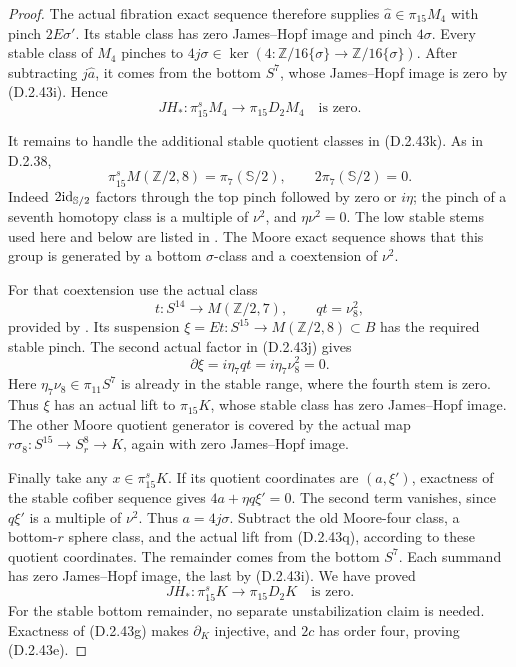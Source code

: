 \begin{proof}
The actual fibration exact sequence therefore supplies
$\widehat a\in\pi_{15}M_4$ with pinch $2E\sigma'$.
Its stable class has zero James--Hopf image and pinch
$4\sigma$. Every stable class of $M_4$ pinches to
$4j\sigma\in\ker(4:\mathbb Z/16\{\sigma\}\to
\mathbb Z/16\{\sigma\})$. After subtracting
$j\widehat a$, it comes from the bottom $S^7$, whose
James--Hopf image is zero by \textup{(D.2.43i)}. Hence
\[
 JH_*:\pi_{15}^{s}M_4\longrightarrow\pi_{15}D_2M_4
 \quad\text{is zero}.
 \tag{D.2.43n}
\]

It remains to handle the additional stable quotient
classes in \textup{(D.2.43k)}. As in D.2.38,
\[
 \pi_{15}^{s}M(\mathbb Z/2,8)=\pi_7(\mathbb S/2),
 \qquad 2\pi_7(\mathbb S/2)=0.
 \tag{D.2.43o}
\]
Indeed $2\mathrm{id}_{\mathbb S/2}$ factors through the top
pinch followed by zero or $i\eta$; the pinch of a seventh
homotopy class is a multiple of $\nu^2$, and
$\eta\nu^2=0$. The low stable stems used here and below
are listed in \cite[Section~2, (2.1), p.~149]{I_Oka1986}.
The Moore exact sequence shows that this group is
generated by a bottom $\sigma$-class and a coextension
of $\nu^2$.

For that coextension use the actual class
\[
 t:S^{14}\longrightarrow M(\mathbb Z/2,7),
 \qquad qt=\nu_8^2,
 \tag{D.2.43p}
\]
provided by
\cite[Lemma~2.8(ii), p.~523]{EH5MorisugiMukai2000}.
Its suspension
$\xi=Et:S^{15}\to M(\mathbb Z/2,8)\subset B$
has the required stable pinch. The second actual factor
in \textup{(D.2.43j)} gives
\[
 \partial\xi=i\eta_7qt=i\eta_7\nu_8^2=0.
 \tag{D.2.43q}
\]
Here $\eta_7\nu_8\in\pi_{11}S^7$ is already in the
stable range, where the fourth stem is zero.
Thus $\xi$ has an actual lift to $\pi_{15}K$, whose
stable class has zero James--Hopf image. The other
Moore quotient generator is covered by the actual map
$r\sigma_8:S^{15}\to S^8_r\to K$, again with zero
James--Hopf image.

Finally take any $x\in\pi_{15}^{s}K$. If its quotient
coordinates are $(a,\xi')$, exactness of the stable
cofiber sequence gives $4a+\eta q\xi'=0$.
The second term vanishes, since $q\xi'$ is a multiple
of $\nu^2$. Thus $a=4j\sigma$. Subtract the old
Moore-four class, a bottom-$r$ sphere class, and the
actual lift from \textup{(D.2.43q)}, according to these
quotient coordinates. The remainder comes from the
bottom $S^7$. Each summand has zero James--Hopf image,
the last by \textup{(D.2.43i)}. We have proved
\[
 JH_*:\pi_{15}^{s}K\longrightarrow\pi_{15}D_2K
 \quad\text{is zero}.
 \tag{D.2.43r}
\]
For the stable bottom remainder, no separate
unstabilization claim is needed. Exactness of
\textup{(D.2.43g)} makes $\partial_K$ injective, and
$2c$ has order four, proving \textup{(D.2.43e)}.


\end{proof}
